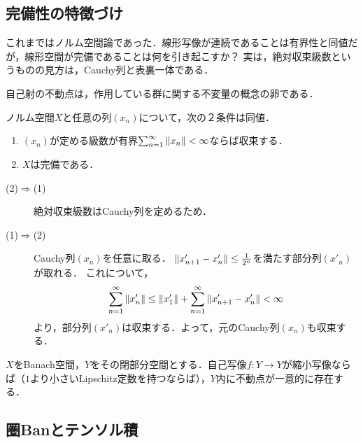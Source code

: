 \documentclass[uplatex,dvipdfmx]{jsreport}
\begin{document}
\subsection{完備性の特徴づけ}

\begin{tcolorbox}[colframe=ForestGreen, colback=ForestGreen!10!white,breakable,colbacktitle=ForestGreen!40!white,coltitle=black,fonttitle=\bfseries\sffamily,
title=]
    これまではノルム空間論であった．線形写像が連続であることは有界性と同値だが，線形空間が完備であることは何を引き起こすか？
    実は，絶対収束級数というものの見方は，Cauchy列と表裏一体である．

    自己射の不動点は，作用している群に関する不変量の概念の卵である．
\end{tcolorbox}

\begin{theorem}[絶対収束級数なるクラスの定義]
    ノルム空間$X$と任意の列$(x_n)$について，次の２条件は同値．
    \begin{enumerate}
        \item $(x_n)$が定める級数が有界$\sum^\infty_{n=1}\|x_n\|<\infty$ならば収束する．
        \item $X$は完備である．
    \end{enumerate}
\end{theorem}
\begin{Proof}\mbox{}
    \begin{description}
        \item[(2)$\Rightarrow$(1)] 絶対収束級数はCauchy列を定めるため．
        \item[(1)$\Rightarrow$(2)] Cauchy列$(x_n)$を任意に取る．
        $\|x'_{n+1}-x'_n\|\le\frac{1}{2^n}$を満たす部分列$(x'_n)$が取れる．
        これについて，
        \[\sum_{n=1}^\infty\|x'_n\|\le\|x'_1\|+\sum_{n=1}^\infty\|x'_{n+1}-x'_n\|<\infty\]
        より，部分列$(x'_n)$は収束する．よって，元のCauchy列$(x_n)$も収束する．
    \end{description}
\end{Proof}

\begin{theorem}
    $X$をBanach空間，$Y$をその閉部分空間とする．自己写像$f:Y\to Y$が縮小写像ならば（$1$より小さいLipschitz定数を持つならば），$Y$内に不動点が一意的に存在する．
\end{theorem}

\subsection{圏Banとテンソル積}
\end{document}
